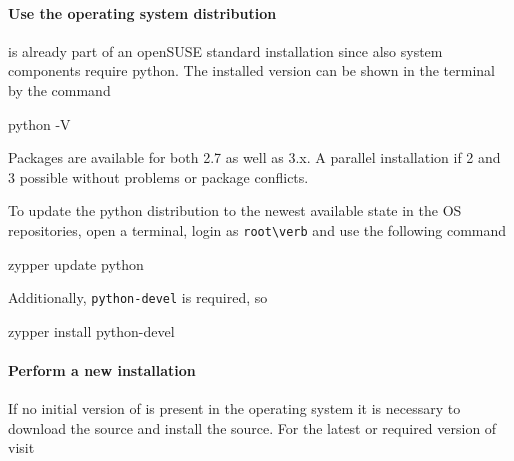 % 
%               
%          
% 

\levelup{\texorpdfstring{\protect\marktool{\pythonname}}{\pythonname{}}}

\paragraph{Use the operating system distribution}

\marktool{\pythonname} is already part of an openSUSE standard installation since also system components require python. The installed version can be shown in the terminal by the command

\begin{code}
python -V
\end{code}

Packages are available for both \marktool{\pythonname} 2.7 as well as \marktool{\pythonname} 3.x. A parallel installation if \marktool{\pythonname} 2 and \marktool{\pythonname} 3 possible without problems or package conflicts.

To update the python distribution to the newest available state in the OS repositories, open a terminal, login as \verb+root\verb+ and use the following command

\begin{code}
zypper update python
\end{code}

Additionally, \verb+python-devel+ is required, so

\begin{code}
zypper install python-devel
\end{code}

\paragraph{Perform a new installation}

If no initial version of \marktool{\pythonname} is present in the operating system it is necessary to download the source and install the source. For the latest or required version of \marktool{\pythonname} visit


